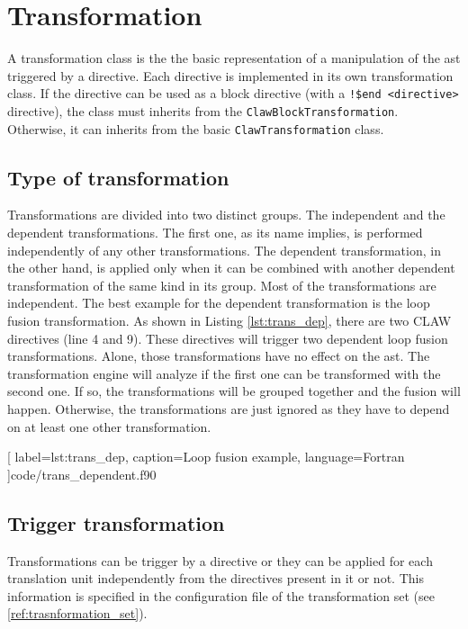 
\chapter{Transformation}
\label{chapter:transformation}
A transformation class is the the basic representation of a manipulation of the
\gls{ast} triggered by a directive. Each directive is implemented in its own
transformation class. If the directive can be used as a block directive (with a
\lstinline|!$end <directive>| directive), the class must inherits from the
\lstinline!ClawBlockTransformation!. Otherwise, it can inherits from the basic
\lstinline!ClawTransformation! class.

\section{Type of transformation}
\label{section:trans_type}
Transformations are divided into two distinct groups. The independent and the
dependent transformations. The first one, as its name implies, is performed
independently of any other transformations. The dependent transformation, in the
other hand, is applied only when it can be combined with another dependent
transformation of the same kind in its group. Most of the transformations are
independent. The best example for the dependent transformation is the loop
fusion transformation. As shown in Listing \ref{lst:trans_dep}, there are two
CLAW directives (line 4 and 9). These directives will trigger two dependent loop
fusion transformations. Alone, those transformations have no effect
on the \gls{ast}. The transformation engine will analyze if the
first one can be transformed with the second one. If so, the transformations will
be grouped together and the fusion will happen. Otherwise, the transformations
are just ignored as they have to depend on at least one other transformation.


  [
    label=lst:trans_dep,
    caption=Loop fusion example,
    language=Fortran
  ]{code/trans_dependent.f90}

\section{Trigger transformation}
\label{section:trans_trigger}
Transformations can be trigger by a directive or they can be applied for each
translation unit independently from the directives present in it or not.
This information is specified in the configuration file of the transformation
set (see \ref{ref:trasnformation_set}).



